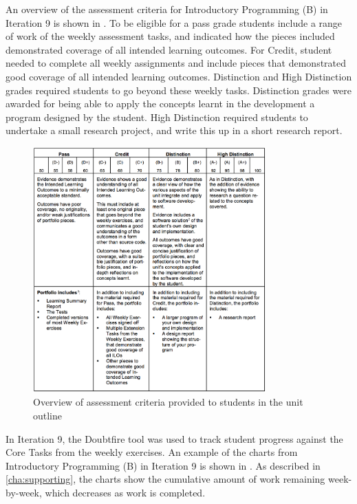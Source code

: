 An overview of the assessment criteria for Introductory Programming (B) in Iteration 9 is shown in . To be eligible for a pass grade students include a range of work of the weekly assessment tasks, and indicated how the pieces included demonstrated coverage of all intended learning outcomes. For Credit, student needed to complete all weekly assignments and include pieces that demonstrated good coverage of all intended learning outcomes. Distinction and High Distinction grades required students to go beyond these weekly tasks. Distinction grades were awarded for being able to apply the concepts learnt in the development a program designed by the student. High Distinction required students to undertake a small research project, and write this up in a short research report.

\begin{figure}[htbp] 
  \centering
  \includegraphics[width=0.8\textwidth]{AssessmentCriteria9}
  \caption{Overview of assessment criteria provided to students in the unit outline}
  \label{fig:i9_assessment_criteria}
\end{figure}

In Iteration 9, the Doubtfire tool was used to track student progress against the Core Tasks from the weekly exercises. An example of the charts from Introductory Programming (B) in Iteration 9 is shown in . As described in \cref{cha:supporting}, the charts show the cumulative amount of work remaining week-by-week, which decreases as work is completed. 

